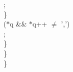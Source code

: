 \begin{flushleft}
\hspace*{12\indentation}{\bf break};\mbox{}\\
\hspace*{9\indentation}\}\mbox{}\\
\hspace*{9\indentation}{\bf while} ($\ast$q \&\& $\ast$q++ $\neq$ ',')\mbox{}\\
\hspace*{12\indentation};\mbox{}\\
\hspace*{6\indentation}\}\mbox{}\\
\hspace*{3\indentation}\}\mbox{}\\
\}\mbox{}\\
\end{flushleft}
